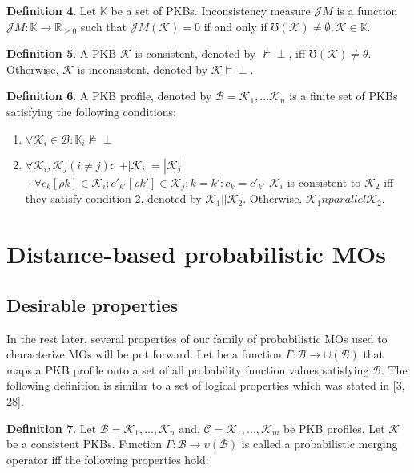 \documentclass[]{iosart2c}
\begin{document}
\textbf{Definition 4}. Let $\mathbb{K}$ be a set of PKBs. Inconsistency measure $\mathcal{J}M$ is a function $\mathcal{J}M: \mathbb{K} \to \mathbb {R}_{\geq 0}$ such that $\mathcal{J}M(\mathcal{K}) = 0$ if and only if $\mho (\mathcal{K}) \neq \emptyset, \mathcal{K} \in \mathbb{K}$.

\textbf{Definition 5}. A PKB $\mathcal{K}$ is consistent, denoted by $\nvDash \perp$, iff $\mho (\mathcal{K}) \neq \theta$. Otherwise, $\mathcal{K}$ is inconsistent, denoted by $\mathcal{K} \models \perp$.

\textbf{Definition 6}. A PKB profile, denoted by $\mathcal{B} = {\mathcal{K}_1, ...\mathcal{K}_n}$ is a finite set of PKBs satisfying the following conditions: 

\begin{enumerate}

\item $\forall \mathcal{K}_i \in \mathcal{B} : \mathbb{K}_i \nvDash \perp$
\item $\forall \mathcal{K}_i,\mathcal{K}_j (i \neq j) :$
	$+|\mathcal{K}_i| = |\mathcal{K}_j|$ 
	$+\forall c_k[\rho k] \in \mathcal{K}_i; c'_{k'} [\rho k'] \in \mathcal{K}_j; k = k' : c_k = c'_{k'}$
$\mathcal{K}_i$ is consistent to $\mathcal{K}_2$ iff they satisfy condition 2, denoted by $\mathcal{K}_1||\mathcal{K}_2$. Otherwise, $\mathcal{K}_1 nparallel \mathcal{K}_2$.

\end{enumerate}

\section{Distance-based probabilistic MOs}

\subsection{Desirable properties}

In the rest later, several properties of our family of probabilistic MOs used to characterize MOs will be put forward. Let be a function $\Gamma: \mathcal{B} \to \cup(\mathcal{B})$ that maps a PKB profile onto a set of all probability function values satisfying $\mathcal{B}$. The following definition is similar to a set of logical properties which was stated in [3, 28].

\textbf{Definition 7}. Let $\mathcal{B} = {\mathcal{K}_1 , ... ,\mathcal{K}_n}$ and, $\mathcal{C} = {\mathcal{K}_1, ... ,\mathcal{K}_m}$ be PKB profiles. Let $\mathcal{K}$ be a consistent PKBs. Function $\Gamma: \mathcal{B} \to \upsilon(\mathcal{B})$ is called a probabilistic merging operator iff the following properties hold:
\end{document}
